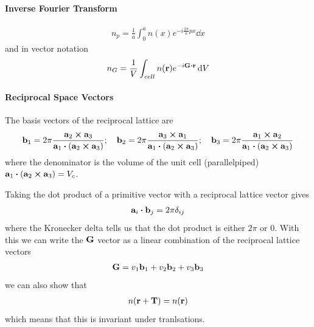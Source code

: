 \documentclass[../main.tex]{subfiles}
\begin{document}
\paragraph{Inverse Fourier Transform}
\begin{align*}
    n_p = \frac{1}{a} \int_0^a n(x) e^{-i\frac{2\pi}{a}px} \dd{x}
\end{align*}
and in vector notation
\begin{align*}
    n_G = \frac{1}{V} \int_{cell} n(\vb{r}) e^{-i\vb{G} \vdot \vb{r}} \dd{V}
\end{align*}

\paragraph{Reciprocal Space Vectors}

The basis vectors of the reciprocal lattice are
\begin{align*}
    \vb{b}_1 = 2\pi \frac{\vb{a}_2 \cross \vb{a}_3}{\vb{a}_1 \vdot (\vb{a}_2 \cross \vb{a}_3)};
    \quad \vb{b}_2 = 2\pi \frac{\vb{a}_3 \cross \vb{a}_1}{\vb{a}_1 \vdot (\vb{a}_2 \cross \vb{a}_3)};
    \quad \vb{b}_3 = 2\pi \frac{\vb{a}_1 \cross \vb{a}_2}{\vb{a}_1 \vdot (\vb{a}_2 \cross \vb{a}_3)}
\end{align*}
where the denominator is the volume of the unit cell (parallelpiped)
$\vb{a}_1 \vdot (\vb{a}_2 \cross \vb{a}_3) = V_c$.

Taking the dot product of a primitive vector with a reciprocal lattice vector gives
\begin{align*}
    \vb{a}_i \vdot \vb{b}_j = 2\pi \delta_{ij}
\end{align*}
where the Kronecker delta tells us that the dot product is either $2\pi$ or $0$. With this we can
write the $\vb{G}$ vector as a linear combination of the reciprocal lattice vectors
\begin{align*}
    \vb{G} = v_1\vb{b}_1 + v_2\vb{b}_2 + v_3\vb{b}_3
\end{align*}
we can also show that
\begin{align*}
    n(\vb{r} + \vb{T}) = n(\vb{r})
\end{align*}
which means that this is invariant under tranlsations.
\end{document}

